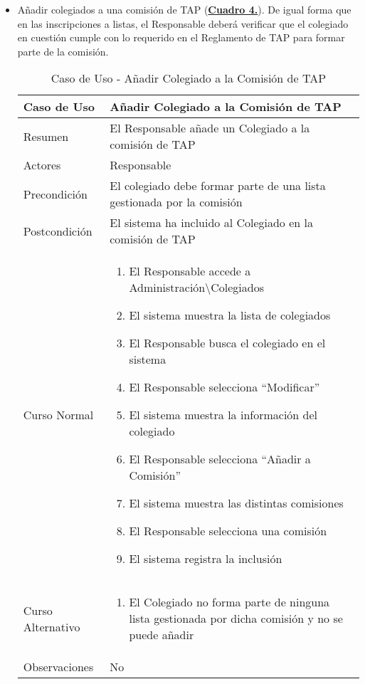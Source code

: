 \begin{itemize}
  \newpage~
	\item \addtocounter{tabla}{1} Añadir colegiados a una comisión de TAP (\textbf{\hyperref[tab:curIncluirColegComisionTAP]{Cuadro 4.}}). De igual forma que en las inscripciones a listas, el Responsable deberá verificar que el colegiado en cuestión cumple con lo requerido en el Reglamento de TAP \cite{reglamentotapcpiia} para formar parte de la comisión.
		\begin{table}[!htbp]
		  \centering  \addtocounter{casouso}{1}
		  \begin{tabular}{|l | p{100mm}|}
		    \textbf{Caso de Uso}  & \textbf{Añadir Colegiado a la Comisión de TAP} \\ \hline
		    Resumen 		 & El Responsable añade un Colegiado a la comisión de TAP \\ \hline
		    Actores  		 & Responsable \\ \hline
		    Precondición    & El colegiado debe formar parte de una lista gestionada por la comisión  \\ \hline
		    Postcondición   & El sistema ha incluido al Colegiado en la comisión de TAP \\ \hline
		    Curso Normal   	& \begin{enumerate}
			  \item El Responsable accede a Administración\textbackslash Colegiados
			  \item El sistema muestra la lista de colegiados
			  \item El Responsable busca el colegiado en el sistema
			  \item El Responsable selecciona ``Modificar''
			  \item El sistema muestra la información del colegiado
			  \item El Responsable selecciona ``Añadir a Comisión''
			  \item El sistema muestra las distintas comisiones
			  \item El Responsable selecciona una comisión
			  \item El sistema registra la inclusión
		    \end{enumerate}  \\ \hline
		    Curso Alternativo  & \begin{enumerate}
			  \item El Colegiado no forma parte de ninguna lista gestionada por dicha comisión y no se puede añadir
		    \end{enumerate}  \\ \hline
		    Observaciones 	 & No  \\ \hline
		  \end{tabular}
		  \caption{Caso de Uso  - Añadir Colegiado a la Comisión de TAP}
		  \label{tab:curIncluirColegComisionTAP}
		\end{table}
		\FloatBarrier
  

\end{itemize}
